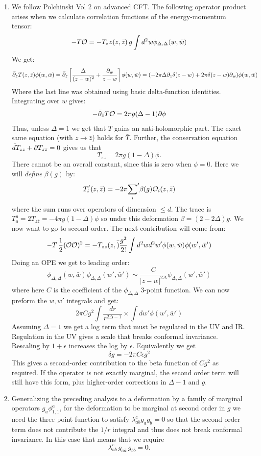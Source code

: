 \documentclass[11pt]{article}
\begin{document}
\begin{enumerate}
	\item We follow Polchinski Vol 2 on advanced CFT. The following operator product arises when we calculate correlation functions of the energy-momentum tensor:
	\[
		- T \mathcal{O} = - T_zz(z, \bar z)\, g \int d^2 w \phi_{\Delta, \Delta}(w, \bar w)
	\]
	We get:
	\[
		\bar {\partial}_{\bar z} T(z, \bar z) \phi(w, \bar w) = \bar {\partial}_{\bar z} \left[ \frac{\Delta}{(z-w)^2} + \frac{\partial_w}{z- w} \right] \phi(w, \bar w) = (-2 \pi \Delta \partial_z \delta(z - w) + 2 \pi \delta(z - w) \partial_w) \phi(w, \bar w)
	\]
	Where the last line was obtained using basic delta-function identities. Integrating over $w$ gives:
	\[
		- \bar {\partial}_{\bar z} T \mathcal{O} = 2 \pi g (\Delta - 1) \partial \phi
	\]
	Thus, unless $\Delta = 1$ we get that $T$ gains an anti-holomorphic part. The exact same equation (with $z \to \bar z$) holds for $\bar T$. Further, the conservation equation $\bar d T_{zz} + \partial T_{z \bar z} = 0$ gives us that
	\[
		T_{z \bar z} = 2 \pi g (1 - \Delta) \phi.
	\]
	There cannot be an overall constant, since this is zero when $\phi = 0$. Here we will \emph{define} $\beta(g)$ by:
	\[
		T^i_i(z, \bar z) = - 2\pi {\sum_{i}}' \beta(g) \mathcal{O}_i(z, \bar z)
	\]
	where the sum runs over operators of dimension $\leq d$. The trace is $T^a_a = 2 T_{z \bar z} = - 4 \pi g (1 - \Delta) \phi$ so under this deformation $\beta = (2 - 2\Delta) g$. We now want to go to second order. The next contribution will come from:
	\[
		- T\, \frac12 (\mathcal{O} \mathcal{O})^2 = - T_{zz} (z, \bar ) \frac{g^2}{2!} \int d^2w d^2w' \phi(w, \bar w) \phi(w', \bar w')
	\]
	Doing an OPE we get to leading order:
	\[
		\phi_{\Delta, \Delta}(w, \bar w) \phi_{\Delta, \Delta}(w', \bar w') \sim \frac{C}{|z-w|^{2 \Delta}} \phi_{\Delta, \Delta}(w', \bar w')
	\]
	where here $C$ is the coefficient of the $\phi_{\Delta, \Delta}$ 3-point function. We can now preform the $w, w'$ integrals and get:
	\[
		2 \pi C g^2 \int \frac{dr}{r^{2\Delta-1}} \times \int dw' \phi(w', \bar w')
	\]
	Assuming $\Delta = 1$ we get a log term that must be regulated in the UV and IR. Regulation in the UV gives a scale that breaks conformal invariance. Rescaling by $1+\epsilon$ increases the log by $\epsilon$. Equivalently we get
	\[
		\delta g = -2 \pi C \epsilon g^2
	\]
	This gives a second-order contribution to the beta function of $C g^2$ as required. If the operator is not exactly marginal, the second order term will still have this form, plus higher-order corrections in $\Delta -1$ and $g$. 

	\item Generalizing the preceding analysis to a deformation by a family of marginal operators $g_a \phi^a_{1,1}$, for the deformation to be marginal at second order in $g$ we need the three-point function to satisfy $\lambda_{ab}^c g_a g_b = 0$ so that the second order term does not contribute the $1/r$ integral and thus does not break conformal invariance. In this case that means that we require
	\[
		\lambda_{a b}^c \, g_{a \bar a} \, g_{b \bar b} = 0.
	\] 
	

\end{enumerate}
\end{document}
